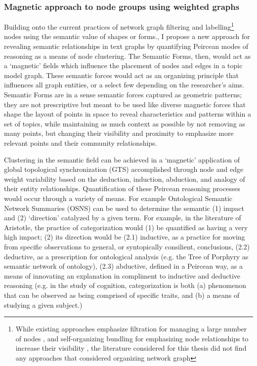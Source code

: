 \subsubsection{Magnetic approach to node groups using weighted graphs}
Building onto the current practices of network graph filtering and labelling\footnote{While existing approaches emphasize filtration for managing a large number of nodes \citep{kovacs_iterative_2024}, and self-organizing bundling for emphasizing node relationships to increase their visibility \citep[p. 1]{holten_forcedirected_2009}, the literature considered for this thesis did not find any approaches that considered organizing network graph} nodes using the semantic value of shapes or forms., I propose a new approach for revealing semantic relationships in text graphs by quantifying Peircean modes of reasoning as a means of node clustering. The Semantic Forms, then, would act as a ‘magnetic’ fields which influence the placement of nodes and edges in a topic model graph. These semantic forces would act as an organizing principle that influences all graph entities, or a select few depending on the researcher’s aims. Semantic Forms are in a sense semantic forces captured as geometric patterns; they are not prescriptive but meant to be used like diverse magnetic forces that shape the layout of points in space to reveal characteristics and patterns within a set of topics, while maintaining as much context as possible by not removing as many points, but changing their visibility and proximity to emphasize more relevant points and their community relationships.

Clustering in the semantic field can be achieved in a ‘magnetic’ application of global topological synchronization (GTS) accomplished through node and edge weight variability based on the deduction, induction, abduction, and analogy of their entity relationships. Quantification of these Peircean reasoning processes would occur through a variety of means. For example Ontological Semantic Network Summaries (OSNS) can be used to determine the semantic (1) impact and (2) ‘direction’ catalyzed by a given term. For example, in the literature of Aristotle, the practice of categorization would (1) be quantified as having a very high impact; (2) its direction would be (2.1) inductive, as a practice for moving from specific observations to general, or syntopically consilient, conclusions, (2.2) deductive, as a prescription for ontological analysis (e.g. the Tree of Porphyry as semantic network of ontology), (2.3) abductive, defined in a Peircean way, as a means of innovating an explanation in compliment to inductive and deductive reasoning (e.g. in the study of cognition, categorization is both (a) phenomenon that can be observed as being comprised of specific traits, and (b) a means of studying a given subject.)
  


